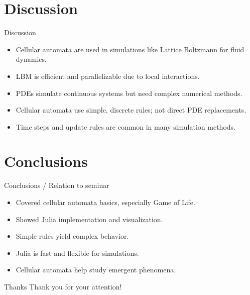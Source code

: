 \section{Discussion}
\begin{frame}{Discussion}
    \begin{itemize}
        \item Cellular automata are used in simulations like Lattice Boltzmann for fluid dynamics.
        \item LBM is efficient and parallelizable due to local interactions.
        \item PDEs simulate continuous systems but need complex numerical methods.
        \item Cellular automata use simple, discrete rules; not direct PDE replacements.
        \item Time steps and update rules are common in many simulation methods.
    \end{itemize}

\end{frame}


\section{Conclusions}
\begin{frame}{Conclusions / Relation to seminar}
    \begin{itemize}
        \item Covered cellular automata basics, especially Game of Life.
        \item Showed Julia implementation and visualization.
        \item Simple rules yield complex behavior.
        \item Julia is fast and flexible for simulations.
        \item Cellular automata help study emergent phenomena.
    \end{itemize}
\end{frame}


\begin{frame}{Thanks}
    \centering
    \Huge
    Thank you for your attention!
\end{frame}
